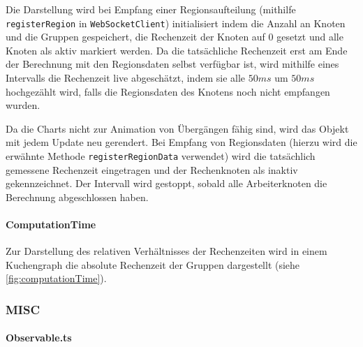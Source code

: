 Die Darstellung wird bei Empfang einer Regionsaufteilung (mithilfe \verb|registerRegion| in \verb|WebSocketClient|)
initialisiert indem die Anzahl an Knoten und die Gruppen gespeichert, die Rechenzeit der Knoten auf \( 0 \) gesetzt und
alle Knoten als aktiv markiert werden.
Da die tatsächliche Rechenzeit erst am Ende der Berechnung mit den Regionsdaten selbst verfügbar ist,
wird mithilfe eines Intervalls die Rechenzeit live abgeschätzt, indem sie alle \( 50ms \) um
\( 50ms \) hochgezählt wird, falls die Regionsdaten des Knotens noch nicht empfangen wurden.

Da die Charts nicht zur Animation von Übergängen fähig sind, wird das Objekt mit jedem Update neu gerendert.
Bei Empfang von Regionsdaten (hierzu wird die erwähnte Methode \verb|registerRegionData| verwendet)
wird die tatsächlich gemessene Rechenzeit eingetragen und der Rechenknoten als inaktiv gekennzeichnet.
Der Intervall wird gestoppt, sobald alle Arbeiterknoten die Berechnung abgeschlossen haben.

\paragraph{ComputationTime}

Zur Darstellung des relativen Verhältnisses der Rechenzeiten wird in einem Kuchengraph
die absolute Rechenzeit der Gruppen dargestellt (siehe \autoref{fig:computationTime}).

\subsubsection{MISC} %

\paragraph{Observable.ts}\label{par:observables}